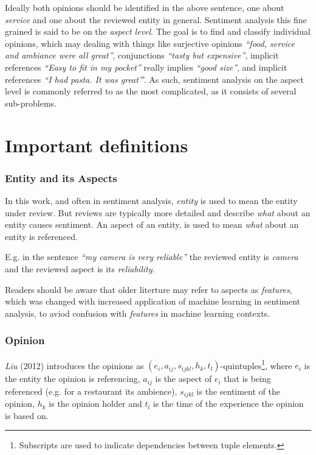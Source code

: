 \documentclass[a4paper,11pt]{kth-mag}
\begin{document}
Ideally both opinions should be identified in the above sentence, one about \emph{service} and one about the reviewed entity in general. Sentiment analysis this fine grained is said to be on the \emph{aspect level}. The goal is to find and classify individual opinions, which may  dealing with things like surjective opinions \emph{``food, service and ambiance were all great''}, conjunctions \emph{``tasty but expensive''}, implicit references \emph{``Easy to fit in my pocket''} really implies \emph{``good size''}, and implicit references \emph{``I had pasta. It was great''}'. As such, sentiment analysis on the aspect level is commonly referred to as the most complicated, as it consists of several sub-problems\cite[chapter 1]{liu2012sentiment}.


\section{Important definitions}

\subsubsection{Entity and its Aspects}
In this work, and often in sentiment analysis, \emph{entity} is used to mean the entity under review. But reviews are typically more detailed
and describe \emph{what} about an entity causes sentiment. An aspect of an entity, is used to mean \emph{what} about an entity is referenced.

E.g. in the sentence \emph{``my camera is very reliable''} the reviewed entity is \emph{camera} and the reviewed aspect is its \emph{reliability}.

Readers should be aware that older literture may refer to aspects as \emph{features}, which was changed with increased application of machine learning in sentiment analysis, to aviod confusion with \emph{features} in machine learning contexts.

\subsubsection{Opinion}
\emph{Liu} (2012) introduces the opinions as $(e_i,a_{ij},s_{ijkl},h_k,t_l)$-quintuples\footnote{Subscripts are used to indicate dependencies between tuple elements.}, where $e_i$ is the entity the opinion is referencing, $a_{ij}$ is the aspect of $e_i$ that is being referenced (e.g. for a restaurant its ambience), $s_{ijkl}$ is the sentiment of the opinion, $h_k$ is the opinion holder and $t_l$ is the time of the experience the opinion is based on\cite[Chapter~2.1]{liu2012sentiment}.
\end{document}
